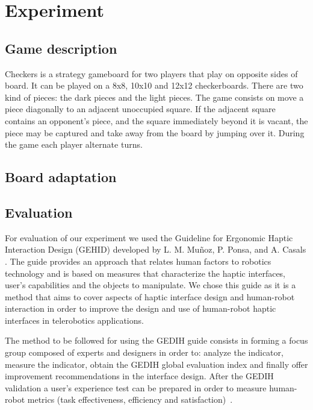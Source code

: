 \documentclass[journal,twoside]{JoPhA}
\begin{document}
\section{Experiment}
\label{sec:experiment}

\subsection{Game description}

Checkers is a strategy gameboard for two players that play on opposite sides of board. It can be played on a 8x8, 10x10 and 12x12 checkerboards.
There are two kind of pieces: the dark pieces and the light pieces. 
The game consists on move a piece diagonally to an adjacent unoccupied square. If the adjacent square contains an opponent's piece, and the square immediately beyond it is vacant, the piece may be captured and take away from the board by jumping over it. During the game each player alternate turns.

\subsection{Board adaptation}


\subsection{Evaluation}

For evaluation of our experiment we used the Guideline for Ergonomic Haptic Interaction Design (GEHID) developed by L. M. Muñoz, P. Ponsa, and A. Casals \cite{Munoz12}. The guide provides an approach that relates human factors to robotics technology and is based on measures that characterize the haptic interfaces, user’s capabilities and the objects to manipulate. We chose this guide as it is a method that aims to cover aspects of haptic interface design and human-robot interaction in order to improve the design and use of human-robot haptic interfaces in telerobotics applications.

The method to be followed for using the GEDIH guide consists in forming a focus group composed of experts and designers in order to: analyze the indicator, measure the indicator, obtain the GEDIH global evaluation index and finally offer improvement recommendations in the interface design. After the GEDIH validation a user’s experience test can be prepared in order to measure human-robot metrics (task effectiveness, efficiency and satisfaction)~\cite{Andonovski10}.
\end{document}
